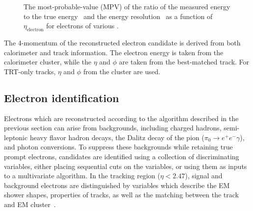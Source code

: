 \begin{figure}[ht]
    \centering
    \caption[]{The most-probable-value (MPV) of the ratio of the
      measured energy to the true
      energy~ and
      the energy
      resolution~
      as a function of $\eta_{\textrm{electron}}$ for electrons of
      various \pt.~\cite{bib:Aad:2014nim}}
\label{chap:reconstruction:fig:elec_mva}
\end{figure}

The 4-momentum of the reconstructed electron candidate is derived from
both calorimeter and track information. The electron energy is taken
from the calorimeter cluster, while the $\eta$ and $\phi$ are taken from
the best-matched track. For TRT-only tracks, $\eta$ and $\phi$ from
the cluster are used. 

\subsection{Electron identification}

Electrons which are reconstructed according to the algorithm described
in the previous section can arise from backgrounds, including charged
hadrons, semi-leptonic heavy flavor hadron decays, the Dalitz decay of the pion ($\pi_0
\rightarrow{e^+ e^- \gamma}$), and photon conversions. To suppress
these backgrounds while retaining true prompt electrons, candidates are
identified using a collection of discriminating variables, either
placing sequential cuts on the variables, or using them as inputs to a
multivariate algorithm. In the tracking region ($\eta < 2.47$), signal
and background electrons are distinguished by variables which describe the
EM shower shapes, properties of tracks, as well as the
matching between the track and EM cluster~\cite{bib:ATLAS-CONF-2014-032}. 

